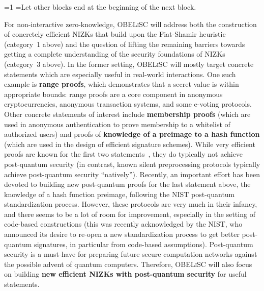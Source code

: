 \documentclass[oneside, a4paper, onecolumn, 11pt]{article}
\newcommand{\OBELiSC}{\textsc{OBELiSC}\xspace}
\newcounter{alphasect}
\def\alphainsection{0}
\newenvironment{alphasection}{%
  \ifnum\alphainsection=1%
    \errhelp={Let other blocks end at the beginning of the next block.}
    \errmessage{Nested Alpha section not allowed}
  \fi%
  \setcounter{alphasect}{0}
  \def\alphainsection{1}
}{%
  \setcounter{alphasect}{0}
  \def\alphainsection{0}
}%
\begin{document}
\begin{alphasection}
For non-interactive zero-knowledge, \OBELiSC will address both the construction of concretely efficient NIZKs that build upon the Fiat-Shamir heuristic (category~1 above) and the question of lifting the remaining barriers towards getting a complete understanding of the security foundations of NIZKs (category~3 above). In the former setting, \OBELiSC will mostly target concrete statements which are especially useful in real-world interactions. One such example is \textbf{range proofs}, which demonstrates that a secret value is within appropriate bounds: range proofs are a core component in anonymous cryptocurrencies, anonymous transaction systems, and some e-voting protocols. Other concrete statements of interest include \textbf{membership proofs} (which are used in anonymous authentication to prove membership to a whitelist of authorized users) and proofs of \textbf{knowledge of a preimage to a hash function} (which are used in the design of efficient signature schemes). While very efficient proofs are known for the first two statements~\cite{EC:GroKoh15,SP:BBBPWM18,CCS:CGKR22}, they do typically not achieve post-quantum security (in contrast, known silent preprocessing protocols typically achieve post-quantum security ``natively''). Recently, an important effort has been devoted to building new post-quantum proofs for the last statement above, the knowledge of a hash function preimage, following the NIST post-quantum standardization process. However, these protocols are very much in their infancy, and there seems to be a lot of room for improvement, especially in the setting of code-based constructions (this was recently acknowledged by the NIST, who announced its desire to re-open a new standardization process to get better post-quantum signatures, in particular from code-based assumptions). Post-quantum security is a must-have for preparing future secure computation networks against the possible advent of quantum computers. Therefore, \OBELiSC will also focus on building \textbf{new efficient NIZKs with post-quantum security} for useful statements.


\end{alphasection}
\end{document}
